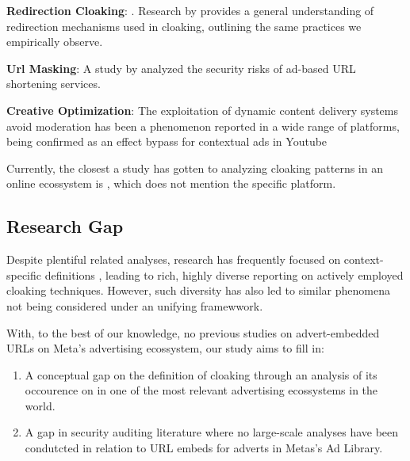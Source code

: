 \textbf{Redirection Cloaking}: . Research by \cite{redirectionFormats} provides a general understanding of redirection mechanisms used in cloaking, outlining the same practices we empirically observe.

\textbf{Url Masking}: A study by \cite{adUrlRisksRelated} analyzed the security risks of ad-based URL shortening services. 

\textbf{Creative Optimization}: The exploitation of dynamic content delivery systems avoid moderation has been a phenomenon reported in a wide range of platforms, being confirmed as an effect bypass for contextual ads in Youtube \cite{youtubeContextCloak}



Currently, the closest a study has gotten to analyzing cloaking patterns in an online ecossystem is \cite{industrialCloaking}, which does not mention the specific platform.



\subsection{Research Gap}
Despite plentiful related analyses, research has frequently focused on context-specific definitions \cite{urlShortAbuse_Cloaking_WWW}, leading to rich, highly diverse reporting on actively employed cloaking techniques. However, such diversity has also led to similar phenomena not being considered under an unifying framewwork.

With, to the best of our knowledge, no previous studies on advert-embedded URLs on Meta's advertising ecossystem, our study aims to fill in:
\begin{enumerate}
    \item A conceptual gap on the definition of cloaking through an analysis of its occourence on in one of the most relevant advertising ecossystems in the world.
    \item A gap in security auditing literature where no large-scale analyses have been condutcted in relation to URL embeds for adverts in Metas's Ad Library.
\end{enumerate}



%

